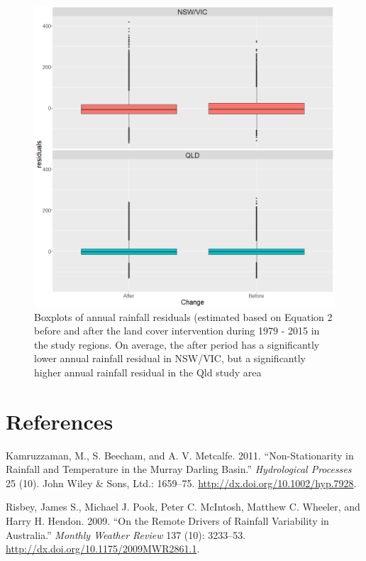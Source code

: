 \documentclass[fleqn,10pt,lineno]{wlpeerj} %
\theoremstyle{definition}
\theoremstyle{definition}
\theoremstyle{definition}
\theoremstyle{remark}
\begin{document}
\begin{figure}
\includegraphics[width=0.7\linewidth]{figures/FigS4} \caption{Boxplots of annual rainfall residuals (estimated based on Equation 2 before and after the land cover intervention during 1979 - 2015 in the study regions. On average, the after period has a significantly lower annual rainfall residual in NSW/VIC, but a significantly higher annual rainfall residual in the Qld study area}\label{fig:meandiff}
\end{figure}

\section*{References}\label{references}

\hypertarget{refs}{}
\hypertarget{ref-Kamruzzaman2011}{}
Kamruzzaman, M., S. Beecham, and A. V. Metcalfe. 2011.
``Non-Stationarity in Rainfall and Temperature in the Murray Darling
Basin.'' \emph{Hydrological Processes} 25 (10). John Wiley \& Sons,
Ltd.: 1659--75. \url{http://dx.doi.org/10.1002/hyp.7928}.

\hypertarget{ref-Risbey2009}{}
Risbey, James S., Michael J. Pook, Peter C. McIntosh, Matthew C.
Wheeler, and Harry H. Hendon. 2009. ``On the Remote Drivers of Rainfall
Variability in Australia.'' \emph{Monthly Weather Review} 137 (10):
3233--53. \url{http://dx.doi.org/10.1175/2009MWR2861.1}.
\end{document}
